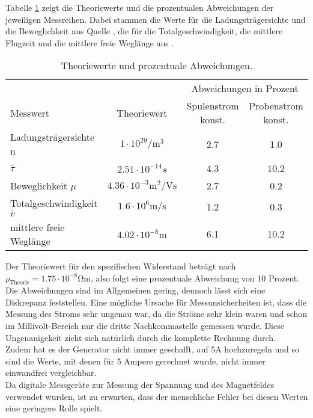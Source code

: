 Tabelle \ref{tab:theo} zeigt die Theoriewerte und die prozentualen Abweichungen 
der jeweiligen Messreihen. Dabei stammen die Werte für die Ladungsträgersichte und
die Beweglichkeit aus Quelle \cite{beweglichkeit}, die für die Totalgeschwindigkeit,
die mittlere Flugzeit und die mittlere freie Weglänge aus \cite{transport}. 
\begin{table}
 \centering
 \caption{Theoriewerte und prozentuale Abweichungen.}
 \label{tab:theo}
 \begin{tabular}{lccc}
  \toprule
   & & \multicolumn{2}{c}{Abweichungen in Prozent}\\
  \cmidrule(lr){3-4}
  Messwert & Theoriewert & Spulenstrom konst. & Probenstrom konst. \\
  \midrule
  Ladungsträgersichte n & $1 \cdot 10^{29} \si{\per\m\cubed}$ & 2.7 & 1.0\\
  $\bar{\tau}$ & $2.51 \cdot 10^{-14} \si{s}$ & 4.3 & 10.2\\
  Beweglichkeit $\mu$ & $4.36 \cdot 10^{-3} \si{\m\squared\per\volt\s}$ & 2.7 & 0.2 \\
  Totalgeschwindigkeit $\bar{v}$ & $1.6 \cdot 10^{6} \si{\m\per\s}$ & 1.2 & 0.3 \\
  mittlere freie Weglänge & $4.02 \cdot 10^{-8} \si{\m}$ & 6.1 & 10.2 \\
  \bottomrule
 \end{tabular}
\end{table}
\noindent Der Theoriewert für den spezifischen Widerstand beträgt nach \cite{spezid} 
$\rho_\text{Theorie} = 1.75 \cdot 10^{-8} \si{\ohm\m}$, also folgt eine prozentuale 
Abweichung von 10 Prozent.\\
Die Abweichungen sind im Allgemeinen gering, dennoch lässt sich eine Diskrepanz feststellen.
Eine mögliche Ursache für Messunsicherheiten ist, dass die Messung des Stroms sehr ungenau
war, da die Ströme sehr klein waren und schon im Millivolt-Bereich nur 
die dritte Nachkommastelle gemessen wurde. Diese Ungenauigekeit zieht sich
natürlich durch die komplette Rechnung durch.\\
Zudem hat es der Generator nicht immer geschafft, auf $5 \si{\A}$ hochzuregeln
und so sind die Werte, mit denen für 5 Ampere gerechnet wurde, nicht immer einwandfrei
vergleichbar. \\
Da digitale Messgeräte zur Messung der Spannung und des Magnetfeldes verwendet
wurden, ist zu erwarten, dass der menschliche Fehler bei diesen Werten eine geringere
Rolle spielt.\\


